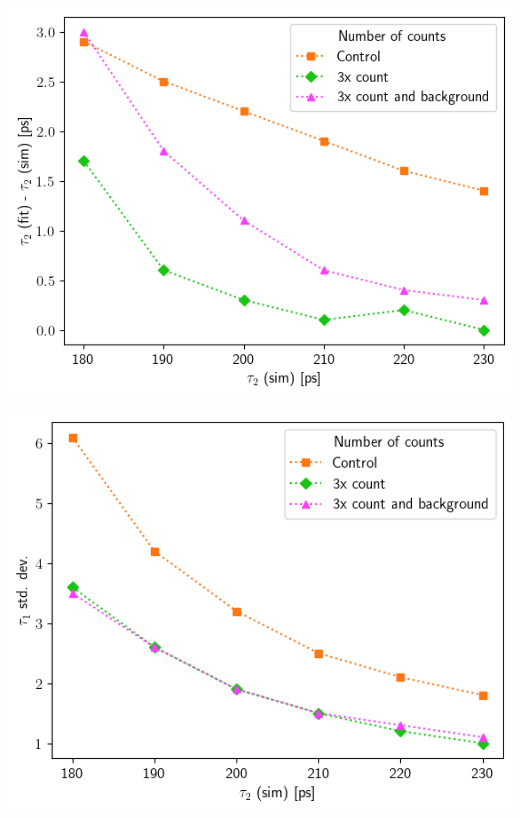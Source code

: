 {\begin{minipage}{ .47\linewidth}
    \includegraphics[width=\linewidth]{Batch 5/t2-diff 5050.png}
    \label{fig:compcount-t2-5050}
\end{minipage}
\hfill
\begin{minipage}{ .47\linewidth}
    \includegraphics[width=\linewidth]{Batch 5/t2-err 5050.png}
    \label{fig:compcount-t2err-5050}
\end{minipage}
\begin{minipage}{ .47\linewidth}

\end{minipage}}
